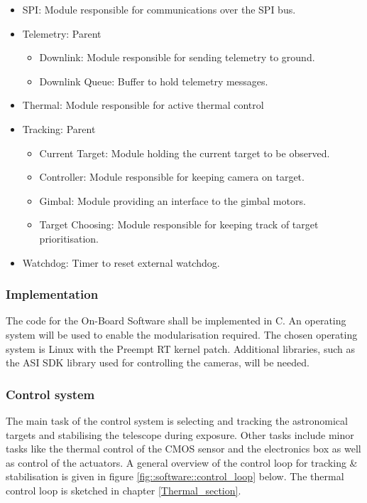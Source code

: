 \begin{itemize}
	\item SPI: Module responsible for communications over the SPI bus.

	\item Telemetry: Parent
		\begin{itemize}
			\item Downlink: Module responsible for sending telemetry to ground.
			\item Downlink Queue: Buffer to hold telemetry messages.
		\end{itemize}

	\item Thermal: Module responsible for active thermal control

	\item Tracking: Parent
		\begin{itemize}
			\item Current Target: Module holding the current target to be observed.
			\item Controller: Module responsible for keeping camera on target.
			\item Gimbal: Module providing an interface to the gimbal motors.
			\item Target Choosing: Module responsible for keeping track of target prioritisation.
		\end{itemize}

	\item Watchdog: Timer to reset external watchdog.

\end{itemize}

\subsubsection{Implementation}

The code for the On-Board Software shall be implemented in C. An operating system will be used to enable the modularisation required. The chosen operating system is Linux with the Preempt RT kernel patch. Additional libraries, such as the ASI SDK library used for controlling the cameras, will be needed.



\subsubsection{Control system}
The main task of the control system is selecting and tracking the astronomical targets and stabilising the telescope during exposure. Other tasks include minor tasks like the thermal control of the CMOS sensor and the electronics box as well as control of the actuators. A general overview of the control loop for tracking \& stabilisation is given in figure  \mbox{\ref{fig::software::control_loop}} below. The thermal control loop is sketched in chapter \mbox{\ref{Thermal_section}}.

